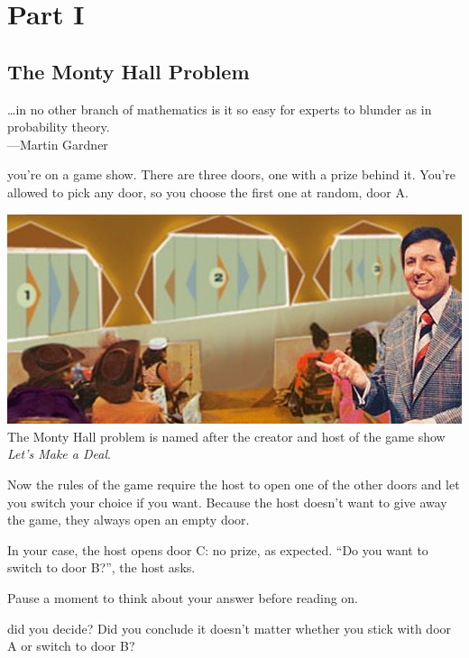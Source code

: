 \documentclass[justified]{tufte-book}
\newenvironment{epigraph}%
{
\begin{flushright}    
\begin{minipage}{20em}
\begin{flushright}
\itshape
}%
{
\end{flushright}
\end{minipage}
\end{flushright}
}
\theoremstyle{definition}
\theoremstyle{definition}
\theoremstyle{definition}
\theoremstyle{remark}
\begin{document}
\hypertarget{part-part-i}{%
\part*{Part I}\label{part-part-i}}

\hypertarget{the-monty-hall-problem}{%
\chapter{The Monty Hall Problem}\label{the-monty-hall-problem}}

\begin{epigraph}
\ldots{}in no other branch of mathematics is it so easy for experts to
blunder as in probability theory.\\
---Martin Gardner
\end{epigraph}

 you're on a game show. There are three doors, one
with a prize behind it. You're allowed to pick any door, so you choose
the first one at random, door A.

\begin{marginfigure}
\includegraphics{img/lets_make_a_deal.png} The Monty Hall problem is
named after the creator and host of the game show \emph{Let's Make a
Deal}.
\end{marginfigure}

Now the rules of the game require the host to open one of the other
doors and let you switch your choice if you want. Because the host
doesn't want to give away the game, they always open an empty door.

In your case, the host opens door C: no prize, as expected. ``Do you
want to switch to door B?'', the host asks.

Pause a moment to think about your answer before reading on.

 did you decide? Did you conclude it doesn't matter
whether you stick with door A or switch to door B?
\end{document}
